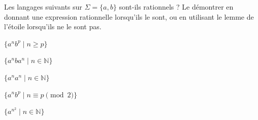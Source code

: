 
\begingroup

\begin{exercice} \label{exo:lexing/expressiveness/types}

  Les langages suivants sur $\Sigma = \{a, b\}$ sont-ils rationnels ? 
  Le démontrer en donnant une expression rationnelle lorsqu'ils le sont,
  ou en utilisant le lemme de l'étoile lorsqu'ils ne le sont pas.
  \begin{questions}
  \item $\{a^nb^p \mid  n \geq p\}$ 
  \item $\{a^n b a^n \mid  n \in \mathbb{N} \}$
  \item $\{a^na^n \mid  n \in \mathbb{N} \}$
  \item $\{a^nb^p \mid  n \equiv p \pmod 2 \}$
  \item $\{a^{n^2} \mid n\in \mathbb{N}\}$
  \end{questions}

\end{exercice}

